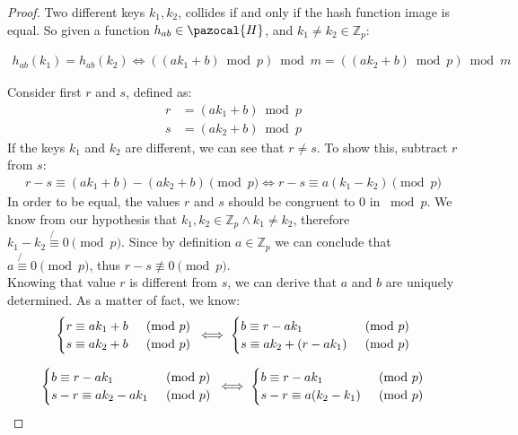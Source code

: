 \documentclass{article}
\newcommand{\Hb}{\pazocal{H}}
\begin{document}
\begin{proof}

Two different keys $k_1, k_2$, collides if and only if the hash function image is equal. So given a function $h_{ab} \in \Hb$, and $k_1 \ne k_2 \in \mathbb{Z}_p$:

\begin{align*}
h_{ab}(k_1) = h_{ab}(k_2)
\iff ((ak_1 + b) \bmod p) \bmod m = ((ak_2 + b) \bmod p) \bmod m
\end{align*}

\noindent Consider first $r$ and $s$, defined as:
\begin{align*}
    r &= (ak_1 + b) \bmod p \\
    s &= (ak_2 + b) \bmod p
\end{align*}
\noindent If the keys $k_1$ and $k_2$ are different, we can see that $r \ne s$. To show this, subtract $r$ from $s$:
\begin{align*}
    r - s \equiv (ak_1 + b) - (ak_2 + b) \pmod p \iff r - s \equiv a(k_1 - k_2) \pmod p
\end{align*}
In order to be equal, the values $r$ and $s$ should be congruent to $0$ in $\bmod p$. We know from our hypothesis that $k_1, k_2 \in \mathbb{Z}_p \land k_1 \ne k_2$, therefore $k_1 - k_2 \not{\equiv} 0 \pmod p$. Since by definition $a \in \mathbb{Z}_p$ we can conclude that $a \not{\equiv} 0 \pmod p$, thus $r - s \not\equiv 0 \pmod p$.\\

\noindent Knowing that value $r$ is different from $s$, we can derive that $a$ and $b$ are uniquely determined. As a matter of fact, we know:
\begin{equation*}
    \begin{cases}
        r \equiv ak_1 + b & \pmod p \\
        s \equiv ak_2 + b & \pmod p
    \end{cases} \\
    \iff
    \begin{cases}
        b \equiv r - ak_1 & \pmod p \\
        s \equiv ak_2 + (r - ak_1) & \pmod p
    \end{cases}
\end{equation*}

\begin{equation*}
    \begin{cases}
        b \equiv r - ak_1 & \pmod p \\
        s - r \equiv ak_2 - ak_1 & \pmod p
    \end{cases} \\
    \iff
    \begin{cases}
        b \equiv r - ak_1 & \pmod p \\
        s - r \equiv a(k_2 - k_1) & \pmod p
    \end{cases} 
\end{equation*}


\end{proof}
\end{document}

